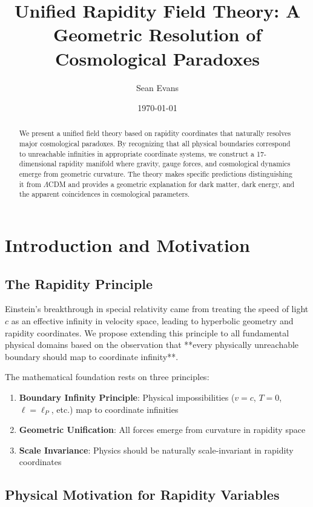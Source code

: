 \documentclass[12pt,a4paper]{article}
\title{Unified Rapidity Field Theory: A Geometric Resolution of Cosmological Paradoxes}
\author{Sean Evans}
\date{\today}
\begin{document}
\maketitle

\begin{abstract}
We present a unified field theory based on rapidity coordinates that naturally resolves major cosmological paradoxes. By recognizing that all physical boundaries correspond to unreachable infinities in appropriate coordinate systems, we construct a 17-dimensional rapidity manifold where gravity, gauge forces, and cosmological dynamics emerge from geometric curvature. The theory makes specific predictions distinguishing it from $\Lambda$CDM and provides a geometric explanation for dark matter, dark energy, and the apparent coincidences in cosmological parameters.
\end{abstract}

\section{Introduction and Motivation}

\subsection{The Rapidity Principle}

Einstein's breakthrough in special relativity came from treating the speed of light $c$ as an effective infinity in velocity space, leading to hyperbolic geometry and rapidity coordinates. We propose extending this principle to all fundamental physical domains based on the observation that **every physically unreachable boundary should map to coordinate infinity**.

The mathematical foundation rests on three principles:
\begin{enumerate}
\item \textbf{Boundary Infinity Principle}: Physical impossibilities ($v=c$, $T=0$, $\ell=\ell_P$, etc.) map to coordinate infinities
\item \textbf{Geometric Unification}: All forces emerge from curvature in rapidity space
\item \textbf{Scale Invariance}: Physics should be naturally scale-invariant in rapidity coordinates
\end{enumerate}

\subsection{Physical Motivation for Rapidity Variables}
\end{document}
